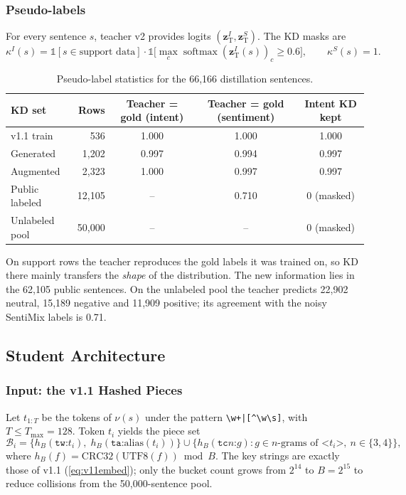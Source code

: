 \documentclass[11pt,a4paper]{article}
\theoremstyle{remark}
\newcommand{\z}{\bm{z}}
\DeclareMathOperator{\softmax}{softmax}
\begin{document}
\subsubsection{Pseudo-labels}
For every sentence $s$, teacher v2 provides logits $(\z^{I}_{\text{T}}, \z^{S}_{\text{T}})$. The KD masks are
\begin{equation}
  \kappa^I(s) = \mathbb{1}[s \in \text{support data}]\cdot\mathbb{1}\big[\max_c \softmax(\z^I_{\text{T}}(s))_c \ge 0.6\big],\qquad
  \kappa^S(s) = 1.
  \label{eq:v12mask}
\end{equation}

\begin{table}[h]
\centering\small
\caption{Pseudo-label statistics for the 66{,}166 distillation sentences.}
\label{tab:v12kd}
\begin{tabular}{@{}l r c c c@{}}
\toprule
KD set & Rows & Teacher = gold (intent) & Teacher = gold (sentiment) & Intent KD kept \\
\midrule
v1.1 train      & 536    & 1.000 & 1.000 & 1.000 \\
Generated       & 1{,}202 & 0.997 & 0.994 & 0.997 \\
Augmented       & 2{,}323 & 1.000 & 0.997 & 0.997 \\
Public labeled  & 12{,}105 & -- & 0.710 & 0 (masked) \\
Unlabeled pool  & 50{,}000 & -- & -- & 0 (masked) \\
\bottomrule
\end{tabular}
\end{table}

On support rows the teacher reproduces the gold labels it was trained on, so KD
there mainly transfers the \emph{shape} of the distribution. The new information
lies in the 62{,}105 public sentences. On the unlabeled pool the teacher predicts
22{,}902 neutral, 15{,}189 negative and 11{,}909 positive; its agreement with the
noisy SentiMix labels is 0.71.

\subsection{Student Architecture}
\label{sec:v12student}

\subsubsection{Input: the v1.1 Hashed Pieces}
Let $t_{1:T}$ be the tokens of $\nu(s)$ under the pattern \verb!\w+|[^\w\s]!, with $T\le T_{\max}=128$. Token $t_i$ yields the piece set
\begin{equation}
  \mathcal{B}_i = \Big\{h_B(\texttt{tw:}t_i),\; h_B(\texttt{ta:}\mathrm{alias}(t_i))\Big\}\cup\Big\{h_B(\texttt{tc}n\texttt{:}g): g \in \text{$n$-grams of } \texttt{<}t_i\texttt{>},\ n\in\{3,4\}\Big\},
  \label{eq:v12pieces}
\end{equation}
where $h_B(f)=\mathrm{CRC32}(\mathrm{UTF8}(f)) \bmod B$. The key strings are exactly those of v1.1 (\cref{eq:v11embed}); only the bucket count grows from $2^{14}$ to $B=2^{15}$ to reduce collisions from the 50{,}000-sentence pool.
\end{document}
